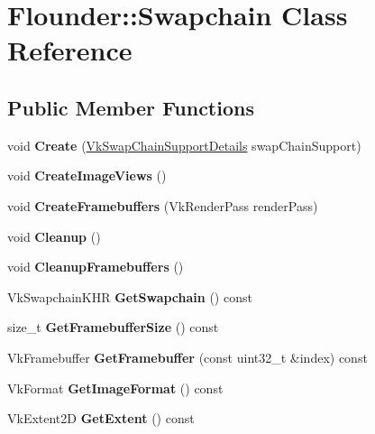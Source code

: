 \hypertarget{class_flounder_1_1_swapchain}{}\section{Flounder\+:\+:Swapchain Class Reference}
\label{class_flounder_1_1_swapchain}
\subsection*{Public Member Functions}
\begin{DoxyCompactItemize}
\item 
\mbox{\label{class_flounder_1_1_swapchain_a7ebb20e7ba7e0d17bf3c988e3e11545f}} 
void {\bfseries Create} (\hyperlink{struct_flounder_1_1_vk_swap_chain_support_details}{Vk\+Swap\+Chain\+Support\+Details} swap\+Chain\+Support)
\item 
\mbox{\label{class_flounder_1_1_swapchain_a5dd4b3f5ca9eaa03890888ecf5785215}} 
void {\bfseries Create\+Image\+Views} ()
\item 
\mbox{\label{class_flounder_1_1_swapchain_ab19e494cbc6df5c2b75a6f9f6cd59dd8}} 
void {\bfseries Create\+Framebuffers} (Vk\+Render\+Pass render\+Pass)
\item 
\mbox{\label{class_flounder_1_1_swapchain_ae0d35a2a5797c1a076e69ea28042fa04}} 
void {\bfseries Cleanup} ()
\item 
\mbox{\label{class_flounder_1_1_swapchain_aef172042a098f3a23f2a329b11f4b427}} 
void {\bfseries Cleanup\+Framebuffers} ()
\item 
\mbox{\label{class_flounder_1_1_swapchain_a96bcf17bff0de2841334f52ae56e4331}} 
Vk\+Swapchain\+K\+HR {\bfseries Get\+Swapchain} () const
\item 
\mbox{\label{class_flounder_1_1_swapchain_ae8fb7c4acc35a89317cf181b47f18f3e}} 
size\+\_\+t {\bfseries Get\+Framebuffer\+Size} () const
\item 
\mbox{\label{class_flounder_1_1_swapchain_aef2d25fa0e4a581e653727ab3a976251}} 
Vk\+Framebuffer {\bfseries Get\+Framebuffer} (const uint32\+\_\+t \&index) const
\item 
\mbox{\label{class_flounder_1_1_swapchain_a7641986d11abd8a489503eb48125c81c}} 
Vk\+Format {\bfseries Get\+Image\+Format} () const
\item 
\mbox{\label{class_flounder_1_1_swapchain_a04b1cc37592759cde7586b8eee2d8ae6}} 
Vk\+Extent2D {\bfseries Get\+Extent} () const
\end{DoxyCompactItemize}
